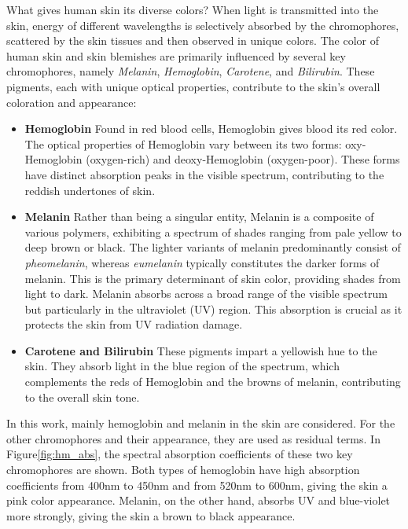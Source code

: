 \begin{spacing}{1.5}
What gives human skin its diverse colors? When light is transmitted into the skin, energy of different wavelengths is selectively absorbed by the chromophores, scattered by the skin tissues and then observed in unique colors. The color of human skin and skin blemishes are primarily influenced by several key chromophores, namely \textit{Melanin}, \textit{Hemoglobin}, \textit{Carotene}, and \textit{Bilirubin}. These pigments, each with unique optical properties, contribute to the skin's overall coloration and appearance:

\begin{itemize}
    \item \textbf{Hemoglobin} Found in red blood cells, Hemoglobin gives blood its red color. The optical properties of Hemoglobin vary between its two forms: oxy-Hemoglobin (oxygen-rich) and deoxy-Hemoglobin (oxygen-poor). These forms have distinct absorption peaks in the visible spectrum, contributing to the reddish undertones of skin.
    \item \textbf{Melanin} Rather than being a singular entity, Melanin is a composite of various polymers, exhibiting a spectrum of shades ranging from pale yellow to deep brown or black. The lighter variants of melanin predominantly consist of \textit{pheomelanin}, whereas \textit{eumelanin} typically constitutes the darker forms of melanin\cite{alalufEthnicVariationMelanin2002a}. This is the primary determinant of skin color\cite{doiSpectralEstimationHuman2003}, providing shades from light to dark. Melanin absorbs across a broad range of the visible spectrum but particularly in the ultraviolet (UV) region\cite{ANDERSON198113}. This absorption is crucial as it protects the skin from UV radiation damage. 
    \item \textbf{Carotene and Bilirubin} These pigments impart a yellowish hue to the skin. They absorb light in the blue region of the spectrum, which complements the reds of Hemoglobin and the browns of melanin, contributing to the overall skin tone\cite{ANDERSON198113}.
\end{itemize}


In this work, mainly hemoglobin and melanin in the skin are considered. For the other chromophores and their appearance, they are used as residual terms. In Figure\ref{fig:hm_abs}, the spectral absorption coefficients of these two key chromophores are shown. Both types of hemoglobin have high absorption coefficients from 400nm to 450nm and from 520nm to 600nm, giving the skin a pink color appearance. Melanin, on the other hand, absorbs UV and blue-violet more strongly, giving the skin a brown to black appearance.


\end{spacing}
